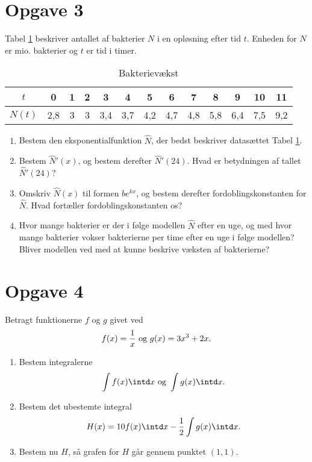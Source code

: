 \section*{Opgave 3}
Tabel \ref{tab:tab1} beskriver antallet af bakterier $N$ i en opløsning efter tid $t$. Enheden for $N$ er mio. bakterier og $t$ er tid i timer. 
\begin{table}[H]
\centering
\begin{tabular}{c|c|c|c|c|c|c|c|c|c|c|c|c}
$t$ & 0 & 1 & 2 & 3 & 4 & 5 & 6 & 7&8&9&10&11\\ \hline
$N(t)$ & 2,8 & 3 & 3 & 3,4 & 3,7 & 4,2 & 4,7 & 4,8 & 5,8 & 6,4 & 7,5 & 9,2
\end{tabular}
\caption{Bakterievækst}
\label{tab:tab1}
\end{table}
\begin{enumerate}
\item Bestem den eksponentialfunktion $\hat{N}$, der bedst beskriver datasættet Tabel \ref{tab:tab1}. 
\item Bestem $\hat{N}'(x)$, og bestem derefter $\hat{N}'(24)$. Hvad er betydningen af tallet $\hat{N}'(24)$?
\item Omskriv $\hat{N}(x)$ til formen $be^{kx}$, og bestem derefter fordoblingskonstanten for $\hat{N}$. Hvad fortæller fordoblingskonstanten os?
\item Hvor mange bakterier er der i følge modellen $\hat{N}$ efter en uge, og med hvor mange bakterier vokser bakterierne per time efter en uge i følge modellen? Bliver modellen ved med at kunne beskrive væksten af bakterierne?
\end{enumerate}

\section*{Opgave 4}
Betragt funktionerne $f$ og $g$ givet ved
\begin{align*}
f(x) = \frac{1}{x} \textnormal{ og } g(x) = 3x^3+2x.
\end{align*}
\begin{enumerate}[label=\roman*)]
\item Bestem integralerne 
\begin{align*}
\int f(x) \intd x \textnormal{ og } \int g(x) \intd x.
\end{align*}
\item Bestem det ubestemte integral
\begin{align*}
H(x) = 10f(x) \intd x - \frac{1}{2}\int g(x) \intd x.
\end{align*}
\item Bestem nu $H$, så grafen for $H$ går gennem punktet $(1,1)$.
\end{enumerate}
